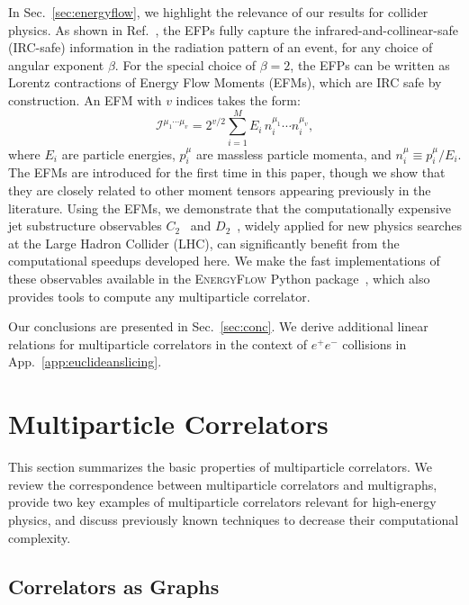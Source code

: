 \documentclass[aps,prd,floatfix,preprintnumbers,twocolumn,groupedaddress,nofootinbib,longbibliography,10pt]{revtex4-1}
\providecommand{\href}[2]{#2}
\DeclareRobustCommand{\Sec}[1]{Sec.~\ref{#1}}
\DeclareRobustCommand{\App}[1]{App.~\ref{#1}}
\DeclareRobustCommand{\Ref}[1]{Ref.~\cite{#1}}
\begin{document}
In \Sec{sec:energyflow}, we highlight the relevance of our results for collider physics.
%
As shown in \Ref{Komiske:2017aww}, the EFPs fully capture the infrared-and-collinear-safe (IRC-safe) information in the radiation pattern of an event, for any choice of angular exponent $\beta$.
%
For the special choice of $\beta = 2$, the EFPs can be written as Lorentz contractions of Energy Flow Moments (EFMs), which are IRC safe by construction.
%
An EFM with $v$ indices takes the form:
%
\begin{equation}
\label{eq:efm}
\mathcal I^{\mu_1 \cdots \mu_v} = 2^{v/2} \sum_{i=1}^M E_i \, n_i^{\mu_1} \cdots n_i^{\mu_v},
\end{equation}
%
where $E_i$ are particle energies, $p_i^\mu$ are massless particle momenta, and $n_i^\mu \equiv p_i^\mu/E_i$.
%
The EFMs are introduced for the first time in this paper, though we show that they are closely related to other moment tensors appearing previously in the literature.
%
Using the EFMs, we demonstrate that the computationally expensive jet substructure observables $C_2$~\cite{Larkoski:2013eya} and $D_2$~\cite{Larkoski:2014gra}, widely applied for new physics searches at the Large Hadron Collider (LHC), can significantly benefit from the computational speedups developed here.
%
We make the fast implementations of these observables available in the \href{https://energyflow.network}{\textsc{EnergyFlow}} Python package~\cite{EnergyFlow}, which also provides tools to compute any multiparticle correlator.


Our conclusions are presented in \Sec{sec:conc}.
%
We derive additional linear relations for multiparticle correlators in the context of $e^+e^-$ collisions in \App{app:euclideanslicing}.


\clearpage



\section{Multiparticle Correlators}
\label{sec:multcorr}


This section summarizes the basic properties of multiparticle correlators.
%
We review the correspondence between multiparticle correlators and multigraphs, provide two key examples of multiparticle correlators relevant for high-energy physics, and discuss previously known techniques to decrease their computational complexity.


\subsection{Correlators as Graphs}
\label{sec:corrgraphs}
\end{document}
